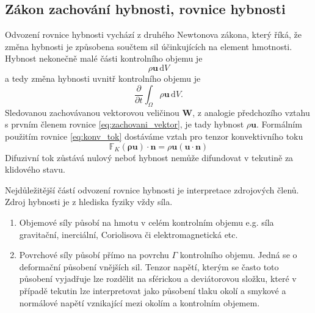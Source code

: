\subsection{Zákon zachování hybnosti, rovnice hybnosti}
Odvození rovnice hybnosti vychází z druhého Newtonova zákona, který říká, že změna hybnosti je způsobena součtem sil účinkujících na element hmotnosti.
Hybnost nekonečně malé části kontrolního objemu je\begin{equation}
\rho \mathbf{u}\,\mathrm{d}V
\end{equation}
a tedy změna hybnosti uvnitř kontrolního objemu je
\begin{equation}
\dfrac{\partial}{\partial t}\int_\Omega\rho\mathbf{u}\,\mathrm{d}V.
\end{equation}
Sledovanou zachovávanou vektorovou veličinou $\mathbf{W}$, z analogie předchozího vztahu s prvním členem rovnice \ref{eq:zachovani_vektor}, je tady hybnost $\rho \mathbf{u}$. Formálním použitím rovnice \ref{eq:konv_tok} dostáváme vztah pro tenzor konvektivního toku
\begin{equation}
\mathbb{F}_K(\mathbf{\rho\mathbf{u}})\cdot \mathbf{n}=\rho\mathbf{u} (\mathbf{u}\cdot\mathbf{n})
\end{equation}
Difuzivní tok zůstává nulový neboť hybnost nemůže difundovat v tekutině za klidového stavu.

Nejdůležitější částí odvození rovnice hybnosti je interpretace zdrojových členů. Zdroj hybnosti je z hlediska fyziky vždy síla.
\begin{enumerate}
	\item Objemové síly působí na hmotu v celém kontrolním objemu e.g. síla gravitační, inerciální, Coriolisova či elektromagnetická etc. 
	\item Povrchové síly působí přímo na povrchu $\Gamma$ kontrolního objemu. Jedná se o deformační působení vnějších sil. Tenzor napětí, kterým se často toto působení vyjadřuje lze rozdělit na sférickou a deviátorovou složku, které v případě tekutin lze interpretovat jako působení tlaku okolí a smykové a normálové napětí vznikající mezi okolím a kontrolním objemem.
\end{enumerate}

